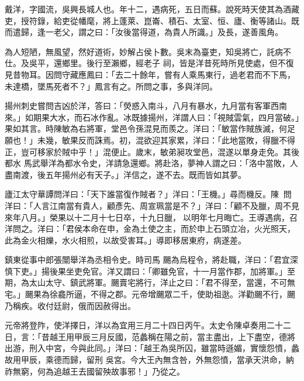 \begin{pinyinscope}
 戴洋，字國流，吳興長城人也。年十二，遇病死，五日而蘇。說死時天使其為酒藏吏，授符錄，給吏從幡麾，將上蓬萊、崑崙、積石、太室、恒、廬、衡等諸山。既而遣歸，逢一老父，謂之曰：「汝後當得道，為貴人所識。」及長，遂善風角。



 為人短陋，無風望，然好道術，妙解占侯卜數。吳末為臺吏，知吳將亡，託病不仕。及吳平，還鄉里。後行至瀨鄉，經老子
 祠，皆是洋昔死時所見使處，但不復見昔物耳。因問守藏應鳳曰：「去二十餘年，嘗有人乘馬東行，過老君而不下馬，未達橋，墜馬死者不？」鳳言有之。所問之事，多與洋同。



 揚州刺史嘗問吉凶於洋，答曰：「熒惑入南斗，八月有暴水，九月當有客軍西南來。」如期果大水，而石冰作亂。冰既據揚州，洋謂人曰：「視賊雲氣，四月當破。」果如其言。時陳敏為右將軍，堂邑令孫混見而羨之。洋曰：「敏當作賊族滅，何足願也！」未幾，敏果反而誅焉。初，混欲迎其家累，洋曰：「此地當敗，得臘不得正，豈可移家於賊中乎！」混便止。歲末，敏弟昶攻堂邑，混遂以單身走免。其後都水
 馬武舉洋為都水令史，洋請急還鄉。將赴洛，夢神人謂之曰：「洛中當敗，人盡南渡，後五年揚州必有天子。」洋信之，遂不去。既而皆如其夢。



 廬江太守華譚問洋曰：「天下誰當復作賊者？」洋曰：「王機。」尋而機反。陳問洋曰：「人言江南當有貴人，顧彥先、周宣珮當是不？」洋曰：「顧不及臘，周不見來年八月。」榮果以十二月十七日卒，十九日臘，以明年七月晦亡。王導遇病，召洋問之。洋曰：「君侯本命在申，金為土使之主，而於申上石頭立冶，火光照天，此為金火相爍，水火相煎，以故受害耳。」導即移居東府，病遂差。



 鎮東從事中郎張闓舉洋為丞相令史。時司馬
 颺為烏程令，將赴職，洋曰：「君宜深慎下吏。」揚後果坐吏免官。洋又謂曰：「卿雖免官，十一月當作郡，加將軍。」至期，為太山太守、鎮武將軍。颺賣宅將行，洋止之曰：「君不得至，當還，不可無宅。」颺果為徐龕所逼，不得之郡。元帝增颺眾二千，使助祖逖。洋勸颺不行，颺乃稱疾。收付廷尉，俄而因赦得出。



 元帝將登阼，使洋擇日，洋以為宜用三月二十四日丙午。太史令陳卓奏用二十二日，言：「昔越王用甲辰三月反國，范蠡稱在陽之前，當主盡出，上下盡空，德將出游，刑入中宮，今與此同。」洋曰：「越王為吳所囚，雖當時遜媚，實懷怨憤，蠡故用甲辰，乘德而歸，留刑
 吳宮。今大王內無含咎，外無怨憤，當承天洪命，納祚無窮，何為追越王去國留殃故事邪！」乃從之。




\end{pinyinscope}
